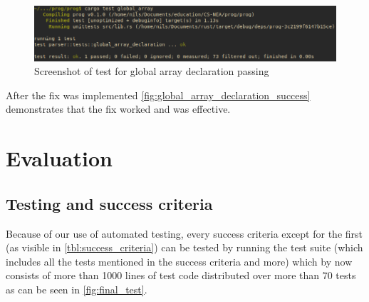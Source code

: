 \documentclass{article}
\begin{document}
\begin{figure}
	\includegraphics[width=\textwidth]{global_array_declaration_success_test}
	\caption{Screenshot of test for global array declaration passing}
	\label{fig:global_array_declaration_success}
\end{figure}

After the fix was implemented \autoref{fig:global_array_declaration_success}
demonstrates that the fix worked and was effective.

\section{Evaluation}



\subsection{Testing and success criteria}

Because of our use of automated testing, every success criteria except for the
first (as visible in \autoref{tbl:success_criteria}) can be tested by running
the test suite (which includes all the tests mentioned in the success criteria
and more) which by now consists of more than 1000 lines of test code
distributed over more than 70 tests as can be seen in \autoref{fig:final_test}.
\end{document}
